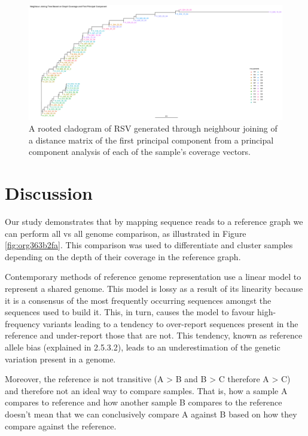 \documentclass[10pt, a4paper]{article}
\begin{document}
\begin{landscape}
\begin{figure}
\centering
\includegraphics[width=.9\linewidth]{../Figures/RSV/HH20_first_principal_component_nj_tree.png}
\caption[RSV PC1 to PC5 cladogram]{\label{fig:orgc3a51bd}
A rooted cladogram of RSV generated through neighbour joining of a distance matrix of the first principal component from a principal component analysis of each of the sample’s coverage vectors.}
\end{figure}
\end{landscape}
\newpage
\section{Discussion}
\label{sec:orgca7af54}
Our study demonstrates that by mapping sequence reads to a reference
graph we can perform all vs all genome comparison, as illustrated in 
Figure \ref{fig:org363b2fa}.
This comparison was used to differentiate and cluster samples depending on the
depth of their coverage in the reference graph.


Contemporary methods of reference genome representation use a linear model to
represent a shared genome. This model is lossy as a result of its linearity
because it is a consensus of the most frequently occurring sequences amongst 
the sequences used to build it. This, in turn, causes the model to favour 
high-frequency variants leading to a tendency to over-report sequences present 
in the reference and under-report those that are not. This tendency, known as
reference allele bias (explained in 2.5.3.2), leads to an underestimation of 
the genetic variation present in a genome. 

Moreover, the reference is not transitive  (A > B and B > C therefore A > C) 
and therefore not an ideal way to compare samples.
That is, how a sample A compares to reference and how another sample B compares
to the reference doesn't mean that we can conclusively compare A against B based
on how they compare against the reference.
\end{document}
